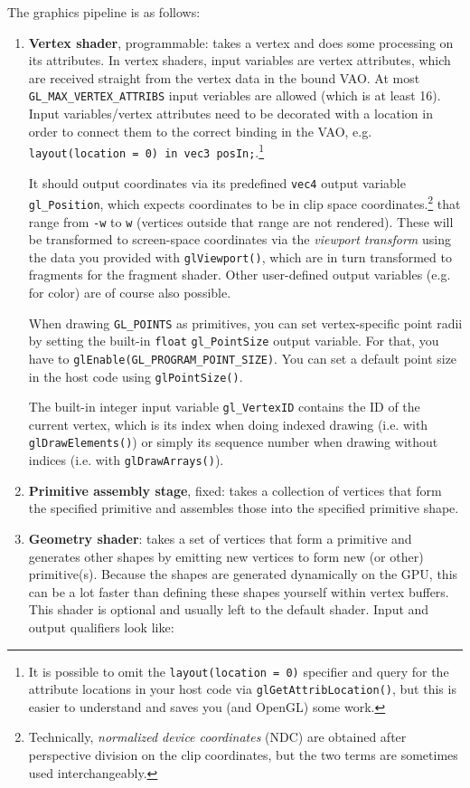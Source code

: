 \documentclass[8pt, table, xcdraw]{article}%
\begin{document}
The graphics pipeline is as follows:
\begin{enumerate}
    \item \textbf{Vertex shader}, programmable: takes a vertex and does some processing on its attributes. In vertex shaders, input variables are vertex attributes, which are received straight from the vertex data in the bound VAO. At most \lstinline{GL_MAX_VERTEX_ATTRIBS} input veriables are allowed (which is at least 16). Input variables/vertex attributes need to be decorated with a location in order to connect them to the correct binding in the VAO, e.g. \lstinline{layout(location = 0) in vec3 posIn;}.\footnote{It is possible to omit the \lstinline{layout(location = 0)} specifier and query for the attribute locations in your host code via \lstinline{glGetAttribLocation()}, but this is easier to understand and saves you (and OpenGL) some work.}
    
    It should output coordinates via its predefined \lstinline{vec4} output variable \lstinline{gl_Position}, which expects coordinates to be in clip space coordinates.\footnote{Technically, \emph{normalized device coordinates} (NDC) are obtained after perspective division on the clip coordinates, but the two terms are sometimes used interchangeably.} that range from \lstinline{-w} to \lstinline{w} (vertices outside that range are not rendered). These will be transformed to screen-space coordinates via the \emph{viewport transform} using the data you provided with \lstinline{glViewport()}, which are in turn transformed to fragments for the fragment shader. Other user-defined output variables (e.g. for color) are of course also possible.
    
    When drawing \lstinline{GL_POINTS} as primitives, you can set vertex-specific point radii by setting the built-in \lstinline{float} \lstinline{gl_PointSize} output variable. For that, you have to \lstinline{glEnable(GL_PROGRAM_POINT_SIZE)}. You can set a default point size in the host code using \lstinline{glPointSize()}.
    
    The built-in integer input variable \lstinline{gl_VertexID} contains the ID of the current vertex, which is its index when doing indexed drawing (i.e. with \lstinline{glDrawElements()}) or simply its sequence number when drawing without indices (i.e. with \lstinline{glDrawArrays()}).
    \item \textbf{Primitive assembly stage}, fixed: takes a collection of vertices that form the specified primitive and assembles those into the specified primitive shape.
    \item \textbf{Geometry shader}: takes a set of vertices that form a primitive and generates other shapes by emitting new vertices to form new (or other) primitive(s). Because the shapes are generated dynamically on the GPU, this can be a lot faster than defining these shapes yourself within vertex buffers. This shader is optional and usually left to the default shader. Input and output qualifiers look like:


\end{enumerate}
\end{document}
